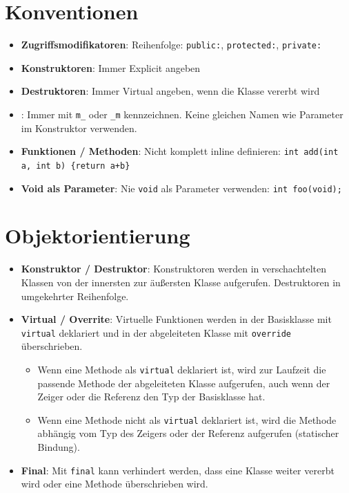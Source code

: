 \documentclass[10pt, a3paper, landscape]{article}
\newcommand{\datastruct}[1]{\textbf{\textcolor{red!60!black}{#1}}}
\begin{document}
\begin{multicols*}{4}
\section{Konventionen}

\begin{itemize}
\item \datastruct{Zugriffsmodifikatoren}: Reihenfolge: \lstinline|public:|, \lstinline|protected:|, \lstinline|private:|
\item \datastruct{Konstruktoren}: Immer Explicit angeben 
\item \datastruct{Destruktoren}: Immer Virtual angeben, wenn die Klasse vererbt wird
\item {}: Immer mit \lstinline|m_| oder \lstinline|_m| kennzeichnen. Keine gleichen Namen wie Parameter im Konstruktor verwenden.
\item \datastruct{Funktionen / Methoden}: Nicht komplett inline definieren: \lstinline|int add(int a, int b) {return a+b}|
\item \datastruct{Void als Parameter}: Nie \lstinline|void| als Parameter verwenden: \lstinline|int foo(void);|
\end{itemize}

\section{Objektorientierung}

\begin{itemize}
   \item \datastruct{Konstruktor / Destruktor}: Konstruktoren werden in verschachtelten Klassen von der innersten zur äußersten Klasse aufgerufen. Destruktoren in umgekehrter Reihenfolge.
   \item \datastruct{Virtual / Overrite}: Virtuelle Funktionen werden in der Basisklasse mit \lstinline|virtual| deklariert und in der abgeleiteten Klasse mit \lstinline|override| überschrieben.
   \begin{itemize}
        \item Wenn eine Methode als \lstinline|virtual| deklariert ist, wird zur Laufzeit die passende Methode der abgeleiteten Klasse aufgerufen, auch wenn der Zeiger oder die Referenz den Typ der Basisklasse hat.
        \item Wenn eine Methode nicht als \lstinline|virtual| deklariert ist, wird die Methode abhängig vom Typ des Zeigers oder der Referenz aufgerufen (statischer Bindung).
   \end{itemize}
    \item \datastruct{Final}: Mit \lstinline|final| kann verhindert werden, dass eine Klasse weiter vererbt wird oder eine Methode überschrieben wird.
\end{itemize}


\end{multicols*}
\end{document}
